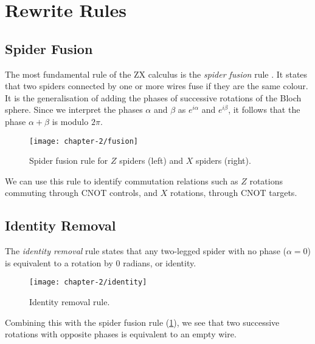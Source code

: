 \section{Rewrite Rules}%
\label{rewrite-rules}

\subsection{Spider Fusion}%
The most fundamental rule of the ZX calculus is the \textit{spider fusion} rule \cite{Wetering2020}. It states that two spiders connected by one or more wires fuse if they are the same colour. It is the generalisation of adding the phases of successive rotations of the Bloch sphere. Since we interpret the phases $\alpha$ and $\beta$ as $e^{i\alpha}$ and $e^{i\beta}$, it follows that the phase $\alpha + \beta$ is modulo $2\pi$.

\begin{figure}[H]
    \centering
    \texttt{[image: chapter-2/fusion]}
    \caption{Spider fusion rule for $Z$ spiders (left) and $X$ spiders (right).}
    \label{spider-fusion}
\end{figure}

We can use this rule to identify commutation relations such as $Z$ rotations commuting through CNOT controls, and $X$ rotations, through CNOT targets.



\subsection{Identity Removal}%

The \textit{identity removal} rule states that any two-legged spider with no phase ($\alpha = 0$) is equivalent to a rotation by 0 radians, or identity.

\begin{figure}[H]
    \centering
    \texttt{[image: chapter-2/identity]}
    \caption{Identity removal rule.}
    \label{identity}
\end{figure}

Combining this with the spider fusion rule (\ref{spider-fusion}), we see that two successive rotations with opposite phases is equivalent to an empty wire.


